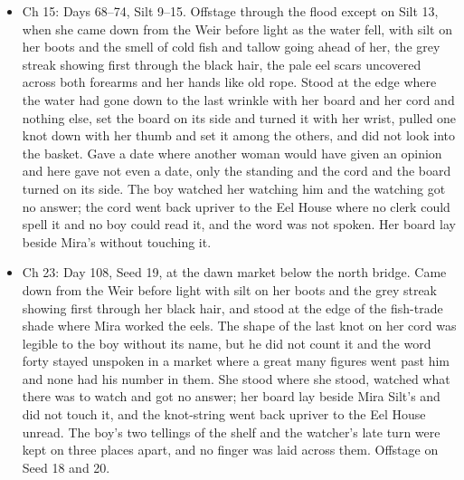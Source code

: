 \documentclass{design/chronicle}
\begin{document}
{\begin{itemize}[leftmargin=1.4em,itemsep=1pt,topsep=3pt,parsep=0pt]

\item Ch 15: Days 68–74, Silt 9–15. Offstage through the flood except on Silt 13, when she came down from the Weir before light as the water fell, with silt on her boots and the smell of cold fish and tallow going ahead of her, the grey streak showing first through the black hair, the pale eel scars uncovered across both forearms and her hands like old rope. Stood at the edge where the water had gone down to the last wrinkle with her board and her cord and nothing else, set the board on its side and turned it with her wrist, pulled one knot down with her thumb and set it among the others, and did not look into the basket. Gave a date where another woman would have given an opinion and here gave not even a date, only the standing and the cord and the board turned on its side. The boy watched her watching him and the watching got no answer; the cord went back upriver to the Eel House where no clerk could spell it and no boy could read it, and the word was not spoken. Her board lay beside Mira’s without touching it.

\end{itemize}

\begin{itemize}[leftmargin=1.4em,itemsep=1pt,topsep=3pt,parsep=0pt]

\item Ch 23: Day 108, Seed 19, at the dawn market below the north bridge. Came down from the Weir before light with silt on her boots and the grey streak showing first through her black hair, and stood at the edge of the fish-trade shade where Mira worked the eels. The shape of the last knot on her cord was legible to the boy without its name, but he did not count it and the word forty stayed unspoken in a market where a great many figures went past him and none had his number in them. She stood where she stood, watched what there was to watch and got no answer; her board lay beside Mira Silt’s and did not touch it, and the knot-string went back upriver to the Eel House unread. The boy’s two tellings of the shelf and the watcher’s late turn were kept on three places apart, and no finger was laid across them. Offstage on Seed 18 and 20.

\end{itemize}

\begin{itemize}[leftmargin=1.4em,itemsep=1pt,topsep=3pt,parsep=0pt]


\end{itemize}}
\end{document}
